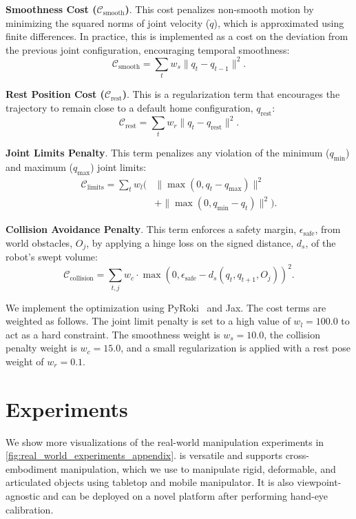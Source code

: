 \begin{appendices}
\textbf{Smoothness Cost ($\mathcal{C}_{\text{smooth}}$)}. This cost penalizes non-smooth motion by minimizing the squared norms of joint velocity ($\dot{q}$), which is approximated using finite differences. In practice, this is implemented as a cost on the deviation from the previous joint configuration, encouraging temporal smoothness:
\begin{equation} \mathcal{C}_{\text{smooth}} = \sum_{t} w_s \|q_t - q_{t-1}\|^2. \end{equation}

\textbf{Rest Position Cost ($\mathcal{C}_{\text{rest}}$)}. This is a regularization term that encourages the trajectory to remain close to a default home configuration, $q_{\text{rest}}$:
\begin{equation} \mathcal{C}_{\text{rest}} = \sum_{t} w_r \|q_t - q_{\text{rest}}\|^2. \end{equation}

\textbf{Joint Limits Penalty}. This term penalizes any violation of the minimum ($q_{\min}$) and maximum ($q_{\max}$) joint limits:
\begin{equation}
\begin{split}
\mathcal{C}_{\text{limits}} = \sum_{t} w_l \big( &\|\max(0, q_t - q_{\max})\|^2 \\
& + \|\max(0, q_{\min} - q_t)\|^2 \big).
\end{split}
\end{equation}

\textbf{Collision Avoidance Penalty}. This term enforces a safety margin, $\epsilon_{\text{safe}}$, from world obstacles, $O_j$, by applying a hinge loss on the signed distance, $d_s$, of the robot's swept volume:
\begin{equation} \mathcal{C}_{\text{collision}} = \sum_{t,j} w_c \cdot \max(0, \epsilon_{\text{safe}} - d_s(q_t, q_{t+1}, O_j))^2. \end{equation}

We implement the optimization using PyRoki~\cite{kim_pyroki_2025} and Jax.
The cost terms are weighted as follows.
The joint limit penalty is set to a high value of $w_l=100.0$ to act as a hard constraint.
The smoothness weight is $w_s=10.0$, the collision penalty weight is $w_c=15.0$, and a small regularization is applied with a rest pose weight of $w_r=0.1$.

\newpage
\section{Experiments}
We show more visualizations of the real-world manipulation experiments in \cref{fig:real_world_experiments_appendix}.
\shortname is versatile and supports cross-embodiment manipulation, which we use to manipulate rigid, deformable, and articulated objects using tabletop and mobile manipulator.
It is also viewpoint-agnostic and can be deployed on a novel platform after performing hand-eye calibration.

\end{appendices}
